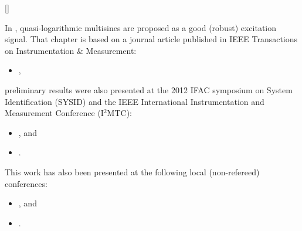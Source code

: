 \begin{refsection}

\makeatletter
\DeclareCiteCommand{\fullcite}
  {%
    }
  {\usedriver
     {}
     {}}
  {\multicitedelim}
  {}
\DeclareCiteCommand{\footfullcite}[\mkbibfootnote]
  {%
    }
  {\usedriver
     {}
     {}}
  {\multicitedelim}
  {}
\makeatother


In , quasi-logarithmic multisines are proposed as a good (robust) excitation signal. 
That chapter is based on a journal article published in \gls{IEEE} Transactions on Instrumentation \& Measurement:
\begin{itemize}
  \item {}, 
\end{itemize}
preliminary results were also presented at the 2012 \gls{IFAC} symposium on System Identification (\textsc{SYSID}) and the \gls{IEEE} International Instrumentation and Measurement Conference (\textsc{I$^{\text{2}}$MTC}):
\begin{itemize}
  \item {}, and
  \item {}.
\end{itemize}
This work has also been presented at the following local (non-refereed) conferences:
\begin{itemize}
  \item {}, and
  \item {}.
\end{itemize}


\end{refsection}
